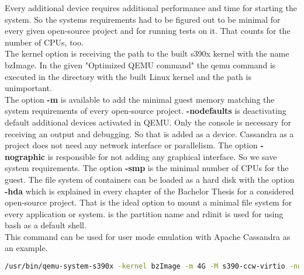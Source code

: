 Every additional device requires additional performance and time for starting the system. 
So the systems requirements had to be figured out to be minimal for every given open-source project and for running tests on it. 
That counts for the number of CPUs, too. \\

The kernel option is receiving the path to the built s390x kernel with the name bzImage. In the given "Optimized QEMU command" the qemu command is executed in the directory with the built Linux kernel and the path is unimportant. \\ 
The option \textbf{-m} is available to add the minimal guest memory matching the system requirements of every open-source project. 
\textbf{-nodefaults} is deactivating default additional devices activated in QEMU. 
Only the console is necessary for receiving an output and debugging. 
So that is added as a device. Cassandra as a project does not need any network interface or parallelism. The 
option \textbf{-nographic} is responsible for not adding any graphical interface. 
So we save system requirements. The option \textbf{-smp} is the minimal number of CPUs for the guest. 
The file system of containers can be loaded as a hard disk with the option \textbf{-hda} which is explained in every chapter of the Bachelor Thesis for a considered open-source project. 
That is the ideal option to mount a minimal file system for every application or system. 
 is the partition name and rdinit is used for using bash as a default shell. \\
This command can be used for user mode emulation with Apache Cassandra as an example.


\begin{lstlisting}[language=bash,caption={Optimized QEMU Command},captionpos=b]
/usr/bin/qemu-system-s390x -kernel bzImage -m 4G -M s390-ccw-virtio -nodefaults -device sclpconsole,chardev=console -parallel none -net none -chardev stdio,id=console,signal=off,mux=on -mon chardev=console -nographic -smp 3 -hda /data/cassandra.img --append 'root=/dev/vda rw console=ttyS0 rdinit=/bin/bash'
\end{lstlisting}

